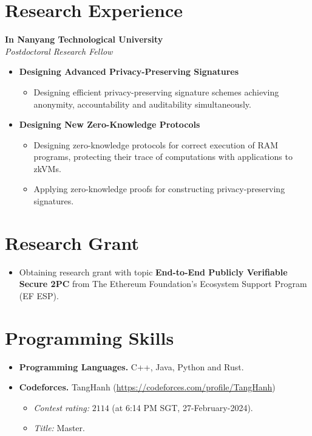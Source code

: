 \documentclass[a4paper, 11pt]{article}
\begin{document}
	\section{Research Experience}
	\textbf{In Nanyang Technological University}\\
	\textit{Postdoctoral Research Fellow}
	\begin{itemize}
		\item \textbf{Designing Advanced Privacy-Preserving Signatures}
		\begin{itemize}
			\item Designing efficient privacy-preserving signature schemes achieving anonymity, accountability and auditability simultaneously.
		\end{itemize}
		\item \textbf{Designing New Zero-Knowledge Protocols}
		\begin{itemize}
			\item Designing zero-knowledge protocols for correct execution of RAM programs, protecting their trace of computations with applications to zkVMs.
			\item Applying zero-knowledge proofs for constructing privacy-preserving signatures.
		\end{itemize}
	\end{itemize}
	
	\section{Research Grant}
	\begin{itemize}
		\item Obtaining research grant with topic \textbf{End-to-End Publicly Verifiable Secure 2PC} from The Ethereum Foundation's Ecosystem Support Program (EF ESP).
	\end{itemize}
	
	\section{Programming Skills}
	\begin{itemize}[noitemsep]
		\item \textbf{Programming Languages.} C++, Java, Python and Rust.
		\item \textbf{Codeforces.} TangHanh (\url{https://codeforces.com/profile/TangHanh})
		\begin{itemize}
			\item \textit{Contest rating:} $2114$ (at 6:14 PM SGT, 27-February-2024).
			\item \textit{Title:} Master.
		\end{itemize}
	\end{itemize}
	
\end{document}
